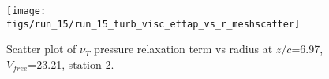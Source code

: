 \begin{figure}[H]
\centering
\texttt{[image: figs/run\_15/run\_15\_turb\_visc\_ettap\_vs\_r\_meshscatter]}
\caption{Scatter plot of $\nu_T$ pressure relaxation term vs radius at $z/c$=6.97, $V_{free}$=23.21, station 2.}
\label{fig:run_15_turb_visc_ettap_vs_r_meshscatter}
\end{figure}


